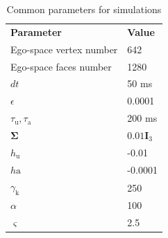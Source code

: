 \documentclass[letterpaper, 10 pt, conference]{ieeeconf}  %
\begin{document}
	\begin{table}[h!]
		\caption{Common parameters for simulations}
		\label{tab:params}
		\begin{center}
			\begin{tabular}{p{4.2cm} p{3.2cm}}
				\cellcolor{darkcyan!20}\textbf{Parameter} & \cellcolor{darkcyan!20}\textbf{Value} \\
				Ego-space vertex number & 642\\
				\cellcolor{gray!8}Ego-space faces number & \cellcolor{gray!8}1280 \\
				$dt$ & 50 ms\\
				\cellcolor{gray!8}$\epsilon$ & \cellcolor{gray!8}0.0001\\
				$\tau_{\mathrm{u}}, \tau_{\mathrm{a}}$ & 200 ms\\
				\cellcolor{gray!8}$\mathbf{\Sigma}$ & \cellcolor{gray!8}$0.01\mathbf{I}_3$ \\
				$h_\mathrm{u}$ & -0.01 \\
				\cellcolor{gray!8}$h\mathrm{a}$ & \cellcolor{gray!8}-0.0001 \\
				$\gamma_{\mathrm{k}}$ & 250\\
				\cellcolor{gray!8}$\alpha$ & \cellcolor{gray!8}100 \\
				$\varsigma$ & 2.5 \\
			\end{tabular}
		\end{center}
	\end{table}
	
\end{document}
